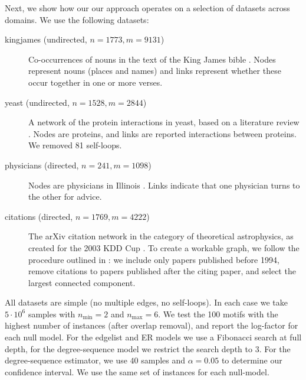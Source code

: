 Next, we show how our our approach operates on a selection of datasets across domains. We use the following datasets:
\begin{description}

\item[kingjames (undirected, $n=1773, m=9131$)] Co-occurrences of nouns in the text of the King James bible \cite{konect:2014:moreno_names,konect:harrison}. Nodes represent nouns (places and names) and links represent whether these occur together in one or more verses.
\item[yeast (undirected, $n=1528, m=2844$)] A network of the protein interactions in yeast, based on a literature review \cite{reguly2006comprehensive}. Nodes are proteins, and links are reported interactions between proteins. We removed 81 self-loops.
\item[physicians (directed, $n=241, m=1098$)] Nodes are physicians in Illinois \cite{konect:2015:moreno_innovation,konect:coleman1957}. Links indicate that one physician turns to the other for advice.
\item[citations (directed, $n=1769, m=4222$)] The arXiv citation network in the category of theoretical astrophysics, as created for the 2003 KDD Cup \cite{gehrke2003overview}. To create a workable graph, we follow the procedure outlined in \cite{carstens2013motifs}: we include only papers published before 1994, remove citations to papers published after the citing paper, and select the largest connected component.
\end{description}

All datasets are simple (no multiple edges, no self-loops). In each case we take $5 \cdot 10^6$ samples with $n_\text{min} = 2$ and $n_\text{max} = 6$. We test the 100 motifs with the highest number of instances (after overlap removal), and report the log-factor for each null model. For the edgelist and ER models we use a Fibonacci search at full depth, for the degree-sequence model we restrict the search depth to $3$. For the degree-sequence estimator, we use $40$ samples and $\alpha=0.05$ to determine our confidence interval. We use the same set of instances for each null-model.

